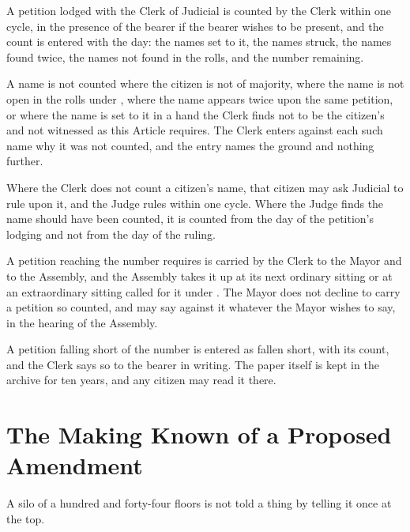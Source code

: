 \begin{clauses}
\item A petition lodged with the Clerk of Judicial is counted by the Clerk within one cycle, in the presence of the bearer if the bearer wishes to be present, and the count is entered with the day: the names set to it, the names struck, the names found twice, the names not found in the rolls, and the number remaining.
\item A name is not counted where the citizen is not of majority, where the name is not open in the rolls under , where the name appears twice upon the same petition, or where the name is set to it in a hand the Clerk finds not to be the citizen's and not witnessed as this Article requires. The Clerk enters against each such name why it was not counted, and the entry names the ground and nothing further.
\item Where the Clerk does not count a citizen's name, that citizen may ask Judicial to rule upon it, and the Judge rules within one cycle. Where the Judge finds the name should have been counted, it is counted from the day of the petition's lodging and not from the day of the ruling.
\item A petition reaching the number  requires is carried by the Clerk to the Mayor and to the Assembly, and the Assembly takes it up at its next ordinary sitting or at an extraordinary sitting called for it under . The Mayor does not decline to carry a petition so counted, and may say against it whatever the Mayor wishes to say, in the hearing of the Assembly.
\item A petition falling short of the number is entered as fallen short, with its count, and the Clerk says so to the bearer in writing. The paper itself is kept in the archive for ten years, and any citizen may read it there.
\end{clauses}

\section{The Making Known of a Proposed Amendment}
\label{sec:amendment:making-known-of-a-proposed-amendment}

A silo of a hundred and forty-four floors is not told a thing by telling it once at the top.


